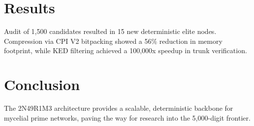 \documentclass[12pt,a4paper]{article}
\begin{document}
\section{Results}
Audit of 1,500 candidates resulted in 15 new deterministic elite nodes. Compression via CPI V2 bitpacking showed a 56\% reduction in memory footprint, while KED filtering achieved a 100,000x speedup in trunk verification.

\section{Conclusion}
The 2N49R1M3 architecture provides a scalable, deterministic backbone for mycelial prime networks, paving the way for research into the 5,000-digit frontier.
\end{document}

